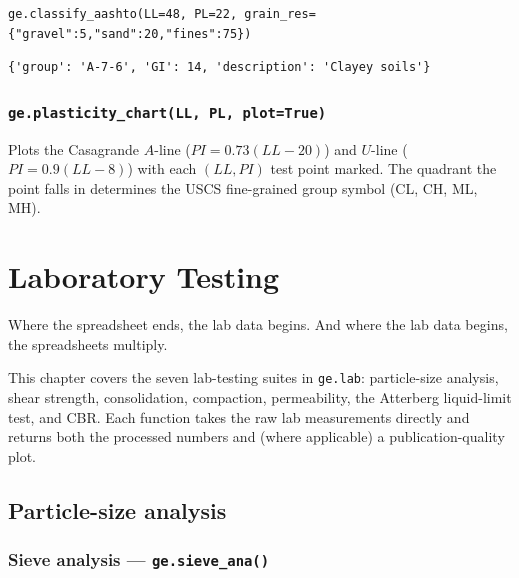 \documentclass[11pt,a4paper,openany]{book}
\begin{document}
\begin{lstlisting}
ge.classify_aashto(LL=48, PL=22, grain_res={"gravel":5,"sand":20,"fines":75})
\end{lstlisting}
\begin{lstlisting}[style=output]
{'group': 'A-7-6', 'GI': 14, 'description': 'Clayey soils'}
\end{lstlisting}

\subsection{\texttt{ge.plasticity\_chart(LL, PL, plot=True)}}

Plots the Casagrande $A$-line ($PI = 0.73(LL - 20)$) and $U$-line
($PI = 0.9(LL - 8)$) with each $(LL, PI)$ test point marked. The
quadrant the point falls in determines the USCS fine-grained
group symbol (\textsf{CL}, \textsf{CH}, \textsf{ML}, \textsf{MH}).

\chapter{Laboratory Testing}\label{ch:lab}

\epigraph{Where the spreadsheet ends, the lab data begins.
And where the lab data begins, the spreadsheets multiply.}{}

\noindent
This chapter covers the seven lab-testing suites in \texttt{ge.lab}:
particle-size analysis, shear strength, consolidation, compaction,
permeability, the Atterberg liquid-limit test, and CBR. Each
function takes the raw lab measurements directly and returns both
the processed numbers and (where applicable) a publication-quality
plot.

\section{Particle-size analysis}\label{sec:particle}

\subsection{Sieve analysis --- \texttt{ge.sieve\_ana()}}
\end{document}
